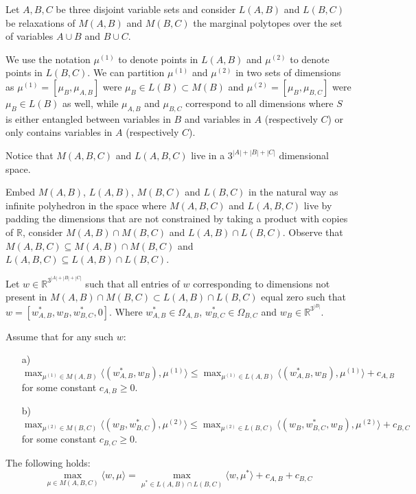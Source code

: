Let $A, B, C$ be three disjoint variable sets and consider $L(A,B)$ and $L(B,C)$ be relaxations of $M(A,B)$ and $M(B,C)$ the marginal polytopes over the set of variables $A \cup B$ and $B \cup C$. 

We use the notation $\mu^{(1)}$ to denote points in $L(A,B)$ and $\mu^{(2)}$ to denote points in $L(B,C)$. We can partition $\mu^{(1)}$ and $\mu^{(2)}$ in two sets of dimensions as $\mu^{(1)} = [\mu_B, \mu_{A,B}]$ were $\mu_B \in L(B) \subset M(B)$ and $\mu^{(2)} = [\mu_B, \mu_{B,C}]$ were $\mu_B \in L(B)$ as well, while $\mu_{A,B}$ and $\mu_{B,C}$ correspond to all dimensions where $S$ is either entangled between variables in $B$ and variables in $A$ (respectively $C$) or only contains variables in $A$ (respectively $C$).


Notice that $M(A,B,C)$ and $L(A,B,C)$ live in a $3^{|A|+|B|+|C|}$ dimensional space. 

Embed $M(A,B)$, $L(A,B)$, $M(B,C)$ and $L(B,C)$ in the natural way as infinite polyhedron in the space where $M(A,B,C)$ and $L(A,B,C)$ live by padding the dimensions that are not constrained by taking a product with copies of $\mathbb{R}$, consider $M(A,B) \cap M(B,C)$ and $L(A,B) \cap L(B,C)$. Observe that $ M(A,B,C) \subseteq M(A,B) \cap M(B,C) $ and $L(A,B,C) \subseteq L(A,B) \cap L(B,C)$.

\begin{theorem}
Let $w \in \mathbb{R}^{3^{|A|+|B|+|C|}}$ such that all entries of $w$ corresponding to dimensions not present in $M(A,B) \cap M(B,C) \subset L(A,B) \cap L(B,C)$ equal zero such that $w = [w^*_{A,B}, w_B, w^*_{B,C}, 0]$. Where $w^*_{A,B} \in \Omega_{A,B}$, $w^*_{B,C} \in \Omega_{B,C}$ and $w_B \in \mathbb{R}^{3^|B|}$.  

Assume that for any such $w$: 
\begin{itemize}
\item[a)] $\max_{\mu^{(1)} \in M(A,B) } \langle (w^*_{A,B}, w_B), \mu^{(1)} \rangle \leq \max_{\mu^{(1)} \in L(A,B)} \langle (w^*_{A,B}, w_B), \mu^{(1)}\rangle + c_{A,B}$ for some constant $c_{A,B} \geq0$.
\item[b)] $\max_{\mu^{(2)} \in M(B,C) } \langle (w_B, w^*_{B,C}), \mu^{(2)} \rangle \leq \max_{\mu^{(2)} \in L(B,C)} \langle (w_B, w^*_{B,C}, w_B), \mu^{(2)}\rangle + c_{B,C}$ for some constant $c_{B,C} \geq 0$.
\end{itemize}

The following holds:
\begin{equation}
\max_{ \mu  \in M(A,B,C) } \langle w, \mu \rangle = \max_{ \mu^* \in L(A,B) \cap L(B,C)} \langle w, \mu^* \rangle + c_{A,B} + c_{B,C}
\end{equation}
\end{theorem}


